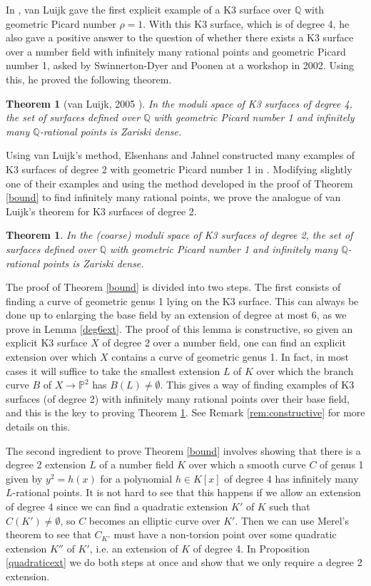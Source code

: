 \documentclass[11pt]{amsart}
\newcommand{\QQ}{\mathbb{Q}}
\newcommand{\PP}{\mathbb{P}}
\newcommand{\map}{\rightarrow}
\theoremstyle{plain}
\newtheorem{theorem}[lemma]{Theorem}
\theoremstyle{remark}
\begin{document}
In \cite{vluijk}, van Luijk gave the first explicit example of a K3 surface over $\QQ$ with geometric Picard number $\rho=1$. With this K3 surface, which is of degree 4, he also gave a positive answer to the question of whether there exists a K3 surface over a number field with infinitely many rational points and geometric Picard number 1, asked by Swinnerton-Dyer and Poonen at a workshop in 2002. Using this, he proved the following theorem. 
\begin{theorem}[van Luijk, 2005 \cite{vluijk}]
In the moduli space of K3 surfaces of degree 4, the set of surfaces defined over $\QQ$ with geometric Picard number 1 and infinitely many $\QQ$-rational points is Zariski dense.     
\end{theorem}

Using van Luijk's method, Elsenhans and Jahnel constructed many examples of K3 surfaces of degree 2 with geometric Picard number 1 in \cite{eljah}. Modifying slightly one of their examples and using the method developed in the proof of Theorem \ref{bound} to find infinitely many rational points, we prove the analogue of van Luijk's theorem for K3 surfaces of degree 2.

\begin{theorem}\label{moduli}
In the (coarse) moduli space of K3 surfaces of degree 2, the set of surfaces defined over $\QQ$ with geometric Picard number 1 and infinitely many $\QQ$-rational points is Zariski dense. 
\end{theorem}


The proof of Theorem \ref{bound} is divided into two steps. The first consists of finding a curve of geometric genus 1 lying on the K3 surface. This can always be done up to enlarging the base field by an extension of degree at most 6, as we prove in Lemma \ref{deg6ext}. The proof of this lemma is constructive, so given an explicit K3 surface $X$ of degree 2 over a number field, one can find an explicit extension over which $X$ contains a curve of geometric genus 1. In fact, in most cases it will suffice to take the smallest extension $L$ of $K$ over which the branch curve $B$ of $X\map \PP^2$ has $B(L)\neq \emptyset$. This gives a way of finding examples of K3 surfaces (of degree 2) with infinitely many rational points over their base field, and this is the key to proving Theorem \ref{moduli}. See Remark \ref{rem:constructive} for more details on this. 

The second ingredient to prove Theorem \ref{bound} involves showing that there is a degree 2 extension $L$ of a number field $K$ over which a smooth curve $C$ of genus 1 given by $y^2=h(x)$ for a polynomial $h\in K[x]$ of degree 4 has infinitely many $L$-rational points. It is not hard to see that this happens if we allow an extension of degree 4 since we can find a quadratic extension $K'$ of $K$ such that $C(K')\neq \emptyset$, so $C$ becomes an elliptic curve over $K'$. Then we can use Merel's theorem \cite[p.~242]{AEC} to see that $C_{K'}$ must have a non-torsion point over some quadratic extension $K''$ of $K'$, i.e. an extension of $K$ of degree 4. In Proposition \ref{quadraticext} we do both steps at once and show that we only require a degree 2 extension.
\end{document}
